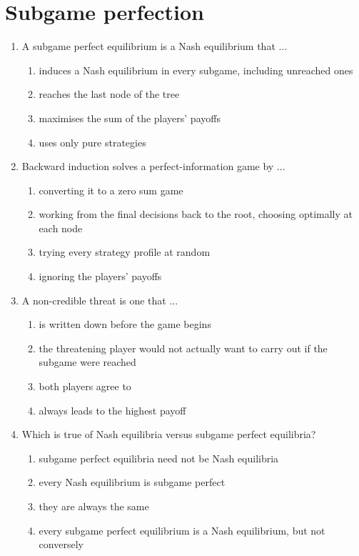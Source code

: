 \documentclass[11pt]{article}
\begin{document}
\section*{Subgame perfection}
\begin{enumerate}[itemsep=6pt]
  \item A subgame perfect equilibrium is a Nash equilibrium that ...
  \begin{enumerate}
    \item induces a Nash equilibrium in every subgame, including unreached ones
    \item reaches the last node of the tree
    \item maximises the sum of the players' payoffs
    \item uses only pure strategies
  \end{enumerate}
  \item Backward induction solves a perfect-information game by ...
  \begin{enumerate}
    \item converting it to a zero sum game
    \item working from the final decisions back to the root, choosing optimally at each node
    \item trying every strategy profile at random
    \item ignoring the players' payoffs
  \end{enumerate}
  \item A non-credible threat is one that ...
  \begin{enumerate}
    \item is written down before the game begins
    \item the threatening player would not actually want to carry out if the subgame were reached
    \item both players agree to
    \item always leads to the highest payoff
  \end{enumerate}
  \item Which is true of Nash equilibria versus subgame perfect equilibria?
  \begin{enumerate}
    \item subgame perfect equilibria need not be Nash equilibria
    \item every Nash equilibrium is subgame perfect
    \item they are always the same
    \item every subgame perfect equilibrium is a Nash equilibrium, but not conversely

\end{enumerate}
\end{enumerate}
\end{document}
